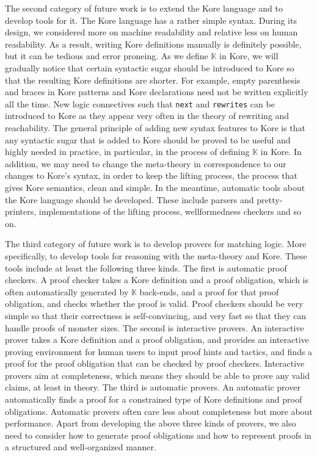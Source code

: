 \documentclass[UTF8,11pt]{article}
\theoremstyle{plain}
\theoremstyle{definition}
\theoremstyle{remark}
\newcommand{\K}{\mbox{$\mathbb{K}$}\xspace}
\newcommand{\slashsymbol}{\symbol{92}}
\newcommand{\slsh}[1]{\texttt{\slashsymbol#1}}
\newcommand{\slnext}{\slsh{next}}
\newcommand{\slrewrites}{\slsh{rewrites}}
\begin{document}
The second category of future work is to extend the Kore language and to
develop tools for it.
The Kore language has a rather simple syntax.
During its design, we considered more on machine readability and relative less
on  human readability.
As a result, writing Kore definitions manually is definitely possible, but it
can be tedious and error proneing.
As we define \K in Kore, we will
gradually notice that certain syntactic sugar should be introduced to Kore so
that the resulting Kore definitions are shorter.
For example, empty parenthesis and braces in Kore patterns and Kore
declarations need not be written explicitly all the time.
New logic connectives such that \texttt{\slnext} and \texttt{\slrewrites} can
be introduced to Kore as they appear very often in the theory of rewriting and
reachability.
The general principle of adding new syntax features to Kore is that any
syntactic sugar that is added to Kore should be proved to be useful and highly
needed in practice, in particular, in the process of defining \K in Kore.
In addition, we may need to change the meta-theory in correspondence to
our changes to Kore's syntax,
in order to keep the lifting process, the process that gives Kore
semantics, clean and simple.
In the meantime, automatic tools about the Kore language should be developed.
These include parsers and pretty-printers, implementations of the lifting
process, wellformedness checkers and so on.

The third category of future work is to develop provers for matching logic.
More specifically, to develop tools for reasoning with the meta-theory and Kore.
These tools include at least the following three kinds.
The first is automatic proof checkers.
A proof checker takes a Kore definition and a proof obligation, which is often
automatically generated by \K back-ends, and a proof for that proof obligation,
and checks whether the proof is valid.
Proof checkers should be very simple so that their correctness is
self-convincing,
and very fast so that they can handle proofs of monster sizes.
The second is interactive provers.
An interactive prover takes a Kore definition and a proof obligation, and
provides an interactive proving environment for human users to input proof
hints and tactics, and finds a proof for the proof obligation that can be
checked by proof checkers.
Interactive provers aim at completeness, which means they should be able to
prove any valid claims, at least in theory.
The third is automatic provers.
An automatic prover automatically finds a proof for a constrained type of Kore
definitions and proof obligations.
Automatic provers often care less about completeness but more about performance.
Apart from developing the above three kinds of provers, we also need to
consider how to generate proof obligations and how to represent proofs in a
structured and well-organized manner.
\end{document}

